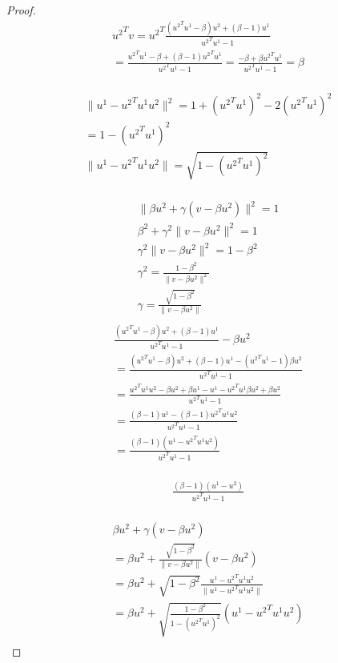 \begin{proof}
\begin{align*}
{u^2}^Tv = {u^2}^T \frac{({u^2}^Tu^1 - \beta )u^2 +(\beta- 1)u^1 }{{u^2}^Tu^1 - 1} \\
= \frac{{u^2}^Tu^1 - \beta  +(\beta- 1){u^2}^Tu^1 }{{u^2}^Tu^1 - 1}
= \frac{- \beta  +\beta{u^2}^Tu^1 }{{u^2}^Tu^1 - 1} = \beta \\
\end{align*}


\begin{align*}
\|u^1 - {u^2}^Tu^1 u^2\|^2 = 1 + ({u^2}^Tu^1)^2 - 2 ({u^2}^Tu^1)^2 \\
= 1 - ({u^2}^Tu^1)^2 \\
\|u^1 - {u^2}^Tu^1 u^2\| = \sqrt{1 - ({u^2}^Tu^1)^2} \\
\end{align*}

\begin{align*}
\|\beta u^2 + \gamma (v - \beta u^2)\|^2 = 1 \\
\beta^2 + \gamma^2 \|v - \beta u^2\|^2 = 1 \\
\gamma^2 \|v - \beta u^2\|^2 = 1 - \beta^2 \\
\gamma^2 = \frac{1 - \beta^2}{\|v - \beta u^2\|^2} \\
\gamma = \frac{\sqrt{1 - \beta^2}}{\|v - \beta u^2\|} \\
\end{align*}
\begin{align*}
\frac{({u^2}^Tu^1 - \beta )u^2 +(\beta- 1)u^1 }{{u^2}^Tu^1 - 1} - \beta u^2 \\
= \frac{({u^2}^Tu^1 - \beta )u^2 +(\beta- 1)u^1 - ({u^2}^Tu^1 - 1 )\beta u^2 }{{u^2}^Tu^1 - 1} \\
= \frac{{u^2}^Tu^1u^2 - \beta u^2 +\beta u^1- u^1 - {u^2}^Tu^1\beta u^2 + \beta u^2  }{{u^2}^Tu^1 - 1} \\
= \frac{(\beta - 1)u^1 - (\beta - 1){u^2}^Tu^1 u^2 }{{u^2}^Tu^1 - 1} \\
= \frac{(\beta - 1)(u^1 - {u^2}^Tu^1 u^2)}{{u^2}^Tu^1 - 1} \\
\end{align*}

\begin{align*}
\frac{(\beta- 1)(u^1 - u^2) }{{u^2}^Tu^1 - 1} \\
\end{align*}

\begin{align*}
\beta u^2 + \gamma (v - \beta u^2) \\
= \beta u^2 + \frac{\sqrt{1 - \beta^2}}{\|v - \beta u^2\|} (v - \beta u^2) \\
= \beta u^2 + \sqrt{1 - \beta^2} \frac{u^1 - {u^2}^Tu^1 u^2 }{\|u^1 - {u^2}^Tu^1 u^2\|} \\
= \beta u^2 + \sqrt{\frac{1 - \beta^2}{1 - ({u^2}^Tu^1)^2}} (u^1 - {u^2}^Tu^1 u^2 ) \\
\end{align*}




\end{proof}
